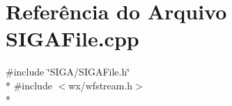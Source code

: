 \section{Referência do Arquivo S\+I\+G\+A\+File.\+cpp}
\label{_s_i_g_a_file_8cpp}
{\ttfamily \#include \char`\"{}S\+I\+G\+A/\+S\+I\+G\+A\+File.\+h\char`\"{}}\\*
{\ttfamily \#include $<$wx/wfstream.\+h$>$}\\*
